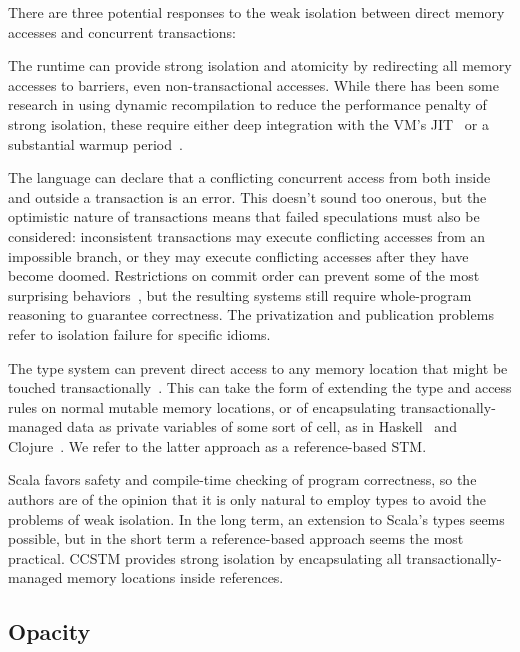 There are three potential responses to the weak isolation between direct memory
accesses and concurrent transactions:
\begin{packed_itemize}

\item The runtime can provide strong isolation and atomicity by redirecting
all memory accesses to barriers, even non-transactional accesses.
While there has been some research in using dynamic recompilation
to reduce the performance penalty of strong isolation, these require
either deep integration with the VM's JIT~\cite{schneider08dynamic}
or a substantial warmup period~\cite{bronson09dbo}.

\item The language can declare that a conflicting concurrent access
from both inside and outside a transaction is an error.  This doesn't
sound too onerous, but the optimistic nature of transactions means that
failed speculations must also be considered: inconsistent transactions
may execute conflicting accesses from an impossible branch, or they
may execute conflicting accesses after they have become doomed.
Restrictions on commit order can prevent some of the most surprising
behaviors~\cite{sgla08}, but the resulting systems still require
whole-program reasoning to guarantee correctness.  The privatization
and publication problems refer to isolation failure
for specific idioms.

\item The type system can prevent direct access to any memory
location that might be touched transactionally~\cite{moore08semantics}.
This can take the form of extending the type and access rules on normal
mutable memory locations, or of encapsulating transactionally-managed
data as private variables of some sort of cell, as in Haskell~\cite{harris05composable}
and Clojure~\cite{hickey08clojure}.  We refer to the latter approach as
a reference-based STM.

\end{packed_itemize}

Scala favors safety and compile-time checking of program correctness,
so the authors are of the opinion that it is only natural to employ types
to avoid the problems of weak isolation.  In the long term, an extension
to Scala's types seems possible, but in the short term a reference-based
approach seems the most practical.  CCSTM provides strong isolation by
encapsulating all transactionally-managed memory locations inside 
references.

\subsection{Opacity}

